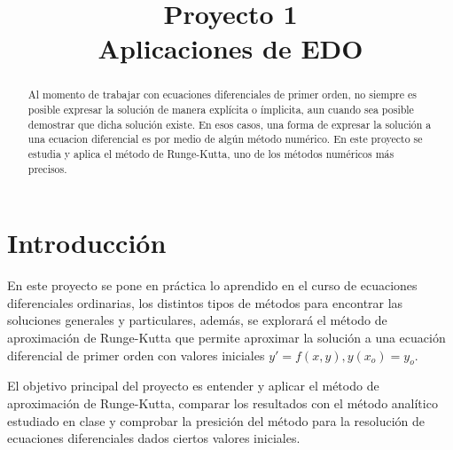 \documentclass[article, 11pt]{IEEEtran}   %
\begin{document}
%
\title{Proyecto 1\\Aplicaciones de EDO}

\author{
}

\maketitle

\begin{abstract}
Al momento de trabajar con ecuaciones diferenciales de primer orden, no siempre es posible expresar la solución de manera explícita o ímplicita, aun cuando sea posible demostrar que dicha solución existe. En esos casos, una forma de expresar la solución a una ecuacion diferencial es por medio de algún método numérico. En este proyecto se estudia y aplica el método de Runge-Kutta, uno de los métodos numéricos más precisos.
\end{abstract}

\section{Introducci\'on}
En este proyecto se pone en práctica lo aprendido en el curso de ecuaciones diferenciales ordinarias, los distintos tipos de métodos para encontrar las soluciones generales y particulares, además, se explorará el método de aproximación de Runge-Kutta que permite aproximar la solución a una ecuación diferencial de primer orden con valores iniciales $y\prime=f(x, y), y(x_o)=y_o$.

El objetivo principal del proyecto es entender y aplicar el método de aproximación de Runge-Kutta, comparar los resultados con el método analítico estudiado en clase y comprobar la presición del método para la resolución de ecuaciones diferenciales dados ciertos valores iniciales.
\end{document}
